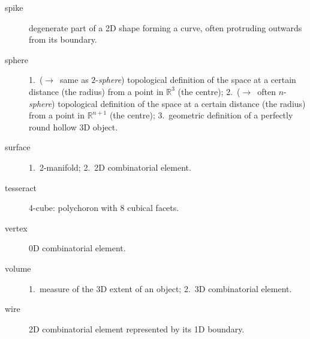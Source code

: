 \begin{multicols}{2}
\begin{description}
\item[spike]
degenerate part of a 2D shape forming a curve, often protruding outwards from its boundary.

\item[sphere]
1.\ ($\rightarrow$\ same as $2$-\emph{sphere}) topological definition of the space at a certain distance (the radius) from a point in $\mathbb{R}^3$ (the centre);
2.\ ($\rightarrow$\ often $n$-\emph{sphere}) topological definition of the space at a certain distance (the radius) from a point in $\mathbb{R}^{n+1}$ (the centre);
3.\ geometric definition of a perfectly round hollow 3D object.

\item[surface]
1.\ 2-manifold;
2.\ 2D combinatorial element.

\item[tesseract]
4-cube: polychoron with 8 cubical facets.

\item[vertex]
0D combinatorial element.

\item[volume]
1.\ measure of the 3D extent of an object;
2.\ 3D combinatorial element.

\item[wire]
2D combinatorial element represented by its 1D boundary.

\end{description}

\end{multicols}

